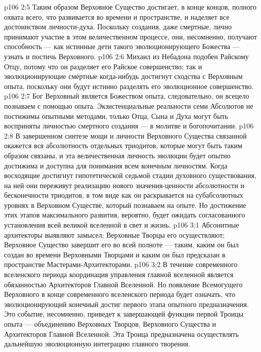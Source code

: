 \vs p106 2:5 Таким образом Верховное Существо достигает, в конце концов, полного охвата всего, что развивается во времени и пространстве, и наделяет все достоинством личности\hyp{}духа. Поскольку создания, даже смертные, лично принимают участие в этом величественном процессе, они, несомненно, получают способность --- как истинные дети такого эволюционирующего Божества --- узнать и постичь Верховного.
\vs p106 2:6 \pc Михаил из Небадона подобен Райскому Отцу, потому что он разделяет его Райское совершенство; так и эволюционирующие смертные когда\hyp{}нибудь достигнут сходства с Верховным опыта, поскольку они будут истинно разделять его эволюционное совершенство.
\vs p106 2:7 \pc Бог Верховный является Божеством опыта, следовательно, он всецело познаваем с помощью опыта. Экзистенциальные реальности семи Абсолютов не постижимы опытными методами, только  Отца, Сына и Духа могут быть восприняты личностью смертного создания --- в молитве и богопочитании.
\vs p106 2:8 В завершенном синтезе мощи и личности Верховного Существа связанной окажется вся абсолютность отдельных триодитов, которые могут быть таким образом связаны, и эта величественная личность эволюции будет опытно достижима и доступна для понимания всем конечным личностям. Когда восходящие достигнут гипотетической седьмой стадии духовного существования, на ней они переживут реализацию нового значения\hyp{}ценности абсолютности и бесконечности триодитов, в том виде как он раскрывается на субабсолютных уровнях в Верховном Существе, который познаваем на опыте. Но достижение этих этапов максимального развития, вероятно, будет ожидать согласованного установления всей великой вселенной в свет и жизнь.
\vs p106 3:1 Абсонитные архитекторы выявляют замысел; Верховные Творцы его осуществляют; Верховное Существо завершит его во всей полноте --- таким, каким он был создан во времени Верховными Творцами и каким он был предсказан в пространстве Мастерами\hyp{}Архитекторами.
\vs p106 3:2 В течение современного вселенского периода координация управления главной вселенной является обязанностью Архитекторов Главной Вселенной. Но появление Всемогущего Верховного в конце современного вселенского периода будет означать, что эволюционирующий конечный достиг первого этапа опытного предназначения. Это событие, несомненно, приведет к завершающей функции первой Троицы опыта --- объединению Верховных Творцов, Верховного Существа и Архитекторов Главной Вселенной. Эта Троица предназначена осуществлять дальнейшую эволюционную интеграцию главного творения.

